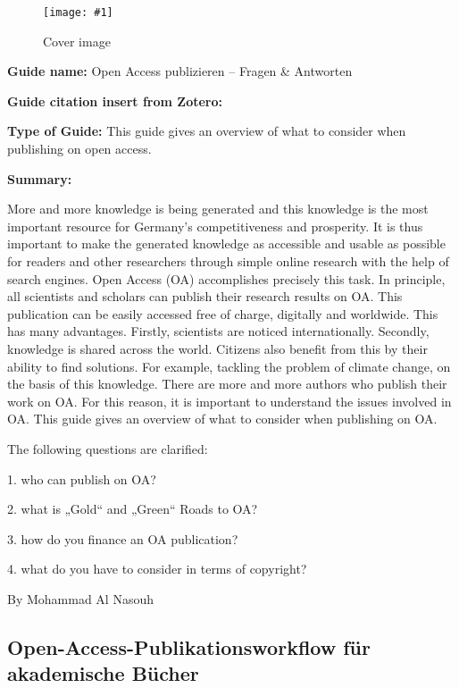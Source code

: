\documentclass{article}
\newlength{\imgwidth}
\newcommand\scaledgraphics[2]{%
                
\settowidth{\imgwidth}{\texttt{[image: \#1]}}%
                
\setlength{\imgwidth}{\minof{\imgwidth}{#2\textwidth}}%
                
\texttt{[image: \#1]}%
                
}
\begin{document}
\begin{center}
\begin{figure}
\scaledgraphics{d3486e9b-9c03-4ba9-9211-5ee2eb18125f.jpg}{0.5}
\caption*{Cover image}\label{F61436691}
\end{figure}


\end{center}


\textbf{Guide name:} Open Access publizieren – Fragen \& Antworten


\textbf{Guide citation insert from Zotero: }\autocite{bundesministerium_fur_bildung_und_forschung_open_2021}


\textbf{Type of Guide: } This guide gives an overview of what to consider when publishing on open access.


\textbf{Summary:}


More and more knowledge is being generated and this knowledge is the most important resource for Germany's competitiveness and prosperity. It is thus important to make the generated knowledge as accessible and usable as possible for readers and other researchers through simple online research with the help of search engines. Open Access (OA) accomplishes precisely this task. In principle, all scientists and scholars can publish their research results on OA. This publication can be easily accessed free of charge, digitally and worldwide. This has many advantages. Firstly, scientists are noticed internationally. Secondly, knowledge is shared across the world. Citizens also benefit from this by their ability to find solutions. For example, tackling the problem of climate change, on the basis of this knowledge. There are more and more authors who publish their work on OA. For this reason, it is important to understand the issues involved in OA. This guide gives an overview of what to consider when publishing on OA.


The following questions are clarified:


1. who can publish on OA?


2. what is „Gold“ and „Green“ Roads to OA?


3. how do you finance an OA publication?


4. what do you have to consider in terms of copyright?


By Mohammad Al Nasouh 


\subsection{Open-Access-Publikationsworkflow für akademische Bücher}\label{H6691479}
\end{document}
